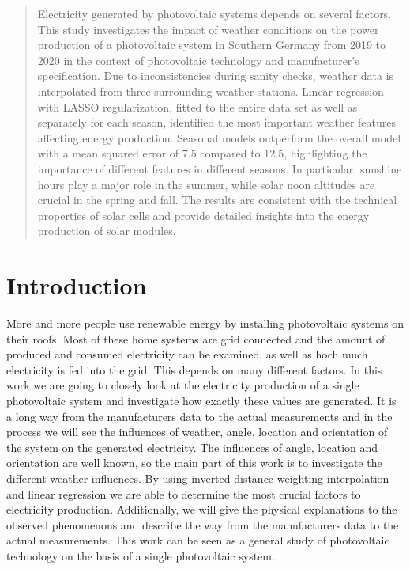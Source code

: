 \documentclass{article}
\begin{document}
\printAffiliationsAndNotice{\icmlEqualContribution} %

\begin{abstract}
Electricity generated by photovoltaic systems depends on several factors. This study investigates the impact of weather conditions on the power production of a photovoltaic system in Southern Germany from 2019 to 2020 in the context of photovoltaic technology and manufacturer's specification. Due to inconsistencies during sanity checks, weather data is interpolated from three surrounding weather stations. Linear regression with LASSO regularization, fitted to the entire data set as well as separately for each season, identified the most important weather features affecting energy production. Seasonal models outperform the overall model with a mean squared error of 7.5 compared to 12.5, highlighting the importance of different features in different seasons. In particular, sunshine hours play a major role in the summer, while solar noon altitudes are crucial in the spring and fall. The results are consistent with the technical properties of solar cells and provide detailed insights into the energy production of solar modules. 
\end{abstract}

\section{Introduction}\label{sec:intro}
More and more people use renewable energy by installing photovoltaic systems on their roofs. 
Most of these home systems are grid connected and the amount of produced and consumed electricity can be examined, as well as hoch much electricity is fed into the grid.
This depends on many different factors.
In this work we are going to closely look at the electricity production of a single photovoltaic system and investigate how exactly these values are generated.
It is a long way from the manufacturers data to the actual measurements and in the process we will see the influences of weather, angle, location and orientation of the system on the generated electricity.
The influences of angle, location and orientation are well known, so the main part of this work is to investigate the different weather influences.
By using inverted distance weighting interpolation and linear regression we are able to determine the most crucial factors to electricity production.
Additionally, we will give the physical explanations to the observed phenomenons and describe the way from the manufacturers data to the actual measurements.
This work can be seen as a general study of photovoltaic technology on the basis of a single photovoltaic system. 
\end{document}

